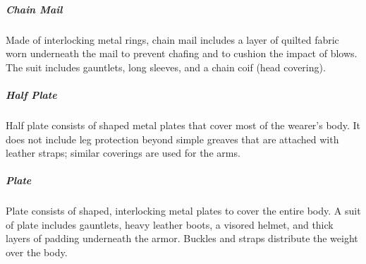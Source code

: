 \subparagraph*{Chain Mail} Made of interlocking metal rings, chain mail includes a layer of quilted fabric worn underneath the mail to prevent chafing and to cushion the impact of blows. The suit includes gauntlets, long sleeves, and a chain coif (head covering).

\subparagraph*{Half Plate} Half plate consists of shaped metal plates that cover most of the wearer's body. It does not include leg protection beyond simple greaves that are attached with leather straps; similar coverings are used for the arms.

\subparagraph*{Plate} Plate consists of shaped, interlocking metal plates to cover the entire body. A suit of plate includes gauntlets, heavy leather boots, a visored helmet, and thick layers of padding underneath the armor. Buckles and straps distribute the weight over the body.


